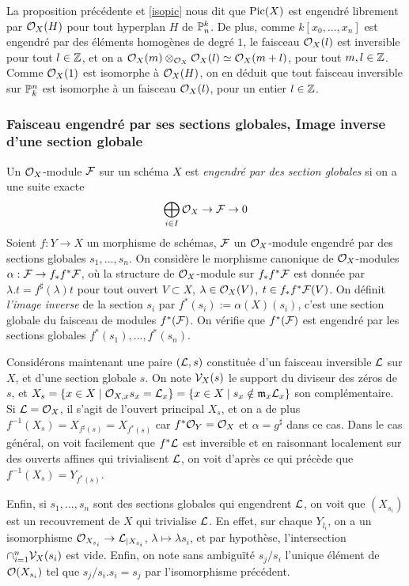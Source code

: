 La proposition précédente et \ref{isopic} nous dit que $\operatorname{Pic}(X)$ est engendré librement par $\mathcal{O}_X(H)$ pour tout hyperplan $H$ de $\mathbb{P}_n^k$. De plus, comme $k[x_0,...,x_n]$ est engendré par des éléments homogènes de degré $1$, le faisceau $\mathcal{O}_X(l)$ est inversible pour tout $l\in \mathbb{Z}$, et on a $\mathcal{O}_X(m)\otimes_{\mathcal{O}_X}\mathcal{O}_X(l)\simeq \mathcal{O}_X(m+l)$, pour tout $m,l\in \mathbb{Z}$. Comme $\mathcal{O}_X(1)$ est isomorphe à $\mathcal{O}_X(H)$, on en déduit que tout faisceau inversible sur $\mathbb{P}_k^n$ est isomorphe à un faisceau $\mathcal{O}_X(l)$, pour un entier $l\in \mathbb{Z}$.

\subsubsection{Faisceau engendré par ses sections globales, Image inverse d'une section globale}
\noindent Un $\mathcal{O}_X$-module $\mathcal{F}$ sur un schéma $X$ est \textit{engendré par des section globales} si on a une suite exacte 
$$\bigoplus_{i\in I}\mathcal{O}_X\rightarrow \mathcal{F}\rightarrow 0$$
Soient $f:Y\rightarrow X$ un morphisme de schémas, $\mathcal{F}$ un $\mathcal{O}_X$-module engendré par des sections globales $s_1,...,s_n$. On considère le morphisme canonique de $\mathcal{O}_X$-modules $\alpha:\mathcal{F}\rightarrow f_*f^*\mathcal{F}$, où la structure de $\mathcal{O}_X$-module sur $f_*f^*\mathcal{F}$ est donnée par $\lambda.t=f^\sharp(\lambda)t$ pour tout ouvert $V\subset X$, $\lambda\in \mathcal{O}_X(V)$, $t\in f_*f^*\mathcal{F}(V)$. On définit \textit{l'image inverse} de la section $s_i$ par $f^*(s_i):=\alpha(X)(s_i)$, c'est une section globale du faisceau de modules $f^*(\mathcal{F})$. On vérifie que $f^*(\mathcal{F})$ est engendré par les sections globales $f^*(s_1),...,f^*(s_n)$.

Considérons maintenant une paire $(\mathcal{L},s)$ constituée d'un faisceau inversible $\mathcal{L}$ sur $X$, et d'une section globale $s$. On note $\mathcal{V}_X(s)$ le support du diviseur des zéros de $s$, et $X_{s}=\lbrace x\in X\mid \mathcal{O}_{X,x}s_x=\mathcal{L}_x\rbrace=\lbrace x\in X\mid s_x\notin \mathfrak{m}_x\mathcal{L}_x\rbrace$ son complémentaire. Si $\mathcal{L}=\mathcal{O}_X$, il s'agit de l'ouvert principal $X_s$, et on a de plus $f^{-1}(X_s)=X_{f^\sharp(s)}=X_{f^*(s)}$ car $f^*\mathcal{O}_Y=\mathcal{O}_X$ et $\alpha=g^\sharp$ dans ce cas. Dans le cas général, on voit facilement que $f^*\mathcal{L}$ est inversible et en raisonnant localement sur des ouverts affines qui trivialisent $\mathcal{L}$, on voit d'après ce qui précède que $f^{-1}(X_s)=Y_{f^*(s)}$.  

Enfin, si $s_1,...,s_n$ sont des sections globales qui engendrent $\mathcal{L}$, on voit que $(X_{s_i})$ est un recouvrement de $X$ qui trivialise $\mathcal{L}$. En effet, sur chaque $Y_{l_i}$, on a un isomorphisme $\mathcal{O}_{X_{s_i}}\rightarrow \mathcal{L}_{|X_{s_i}}$, $\lambda \mapsto \lambda s_i$, et par hypothèse, l'intersection $\cap_{i=1}^n \mathcal{V}_X(s_i)$ est vide. Enfin, on note sans ambiguïté $s_j/s_i$ l'unique élément de $\mathcal{O}(X_{s_i})$ tel que $s_j/s_i.s_i=s_j$ par l'isomorphisme précédent.

